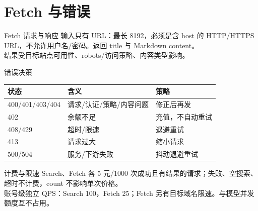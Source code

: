 \documentclass[aspectratio=169,UTF8]{ctexbeamer}
\begin{document}
\section{Fetch 与错误}
\begin{frame}{Fetch 请求与响应}
输入只有 URL：最长 8192，必须是含 host 的 HTTP/HTTPS URL，不允许用户名/密码。返回 title 与 Markdown content。\\[8pt]
结果受目标站点可用性、robots/访问策略、内容类型影响。
\end{frame}
\begin{frame}{错误决策}
\small
\begin{tabular}{lll}
\toprule
状态 & 含义 & 策略\\
\midrule
400/401/403/404 & 请求/认证/策略/内容问题 & 修正后再发\\
402 & 余额不足 & 充值，不自动重试\\
408/429 & 超时/限速 & 退避重试\\
413 & 请求过大 & 缩小请求\\
500/504 & 服务/下游失败 & 抖动退避重试\\
\bottomrule
\end{tabular}
\end{frame}
\begin{frame}{计费与限速}
Search、Fetch 各 5 元/1000 次成功且有结果的请求；失败、空搜索、超时不计费，count 不影响单次价格。\\[8pt]
账号级独立 QPS：Search 100，Fetch 25；Fetch 另有目标域名限速。与模型并发额度互不占用。
\end{frame}
\end{document}
